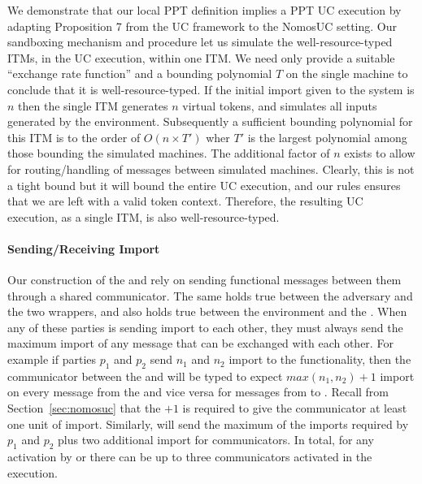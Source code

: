 We demonstrate that our local PPT definition implies a PPT UC execution by adapting Proposition 7 from the UC framework to the NomosUC setting.
Our sandboxing mechanism and  procedure let us simulate the well-resource-typed ITMs, in the UC execution, within one ITM.
We need only provide a suitable ``exchange rate function'' \GlobalF and a bounding polynomial $T$ on the single machine to conclude that it is well-resource-typed.
If the initial import given to the system is $n$ then the single ITM generates $n$ virtual tokens, and simulates all inputs generated by the environment.
Subsequently a sufficient bounding polynomial for this ITM is to the order of $O(n \times T')$ wher $T'$ is the largest polynomial among those bounding the simulated machines. The additional factor of $n$ exists to allow for routing/handling of messages between simulated machines.
Clearly, this is not a tight bound but it will bound the entire UC execution, and our  rules ensures that we are left with a valid token context.
Therefore, the resulting UC execution, as a single ITM, is also well-resource-typed.

\paragraph{Sending/Receiving Import}
Our construction of the \partywrapper and \fwrapper rely on sending functional messages between them through a shared communicator.
The same holds true between the adversary and the two wrappers, and also holds true between the environment and the \partywrapper.
When any of these parties is sending import to each other, they must always send the maximum import of any message that can be exchanged with each other.
For example if parties $p_1$ and $p_2$ send $n_1$ and $n_2$ import to the functionality, then the communicator between the \partywrapper and \fwrapper will be typed to expect $max(n_1, n_2)+1$ import on every message from the \partywrapper and vice versa for messages from \fwrapper to \partywrapper. 
Recall from Section~\ref{sec:nomosuc} that the $+1$ is required to give the communicator at least one unit of import.
Similarly, \Z will send the maximum of the imports required by $p_1$ and $p_2$ plus two additional import for communicators.
In total, for any activation by \A or \Z there can be up to three communicators activated in the execution. 


